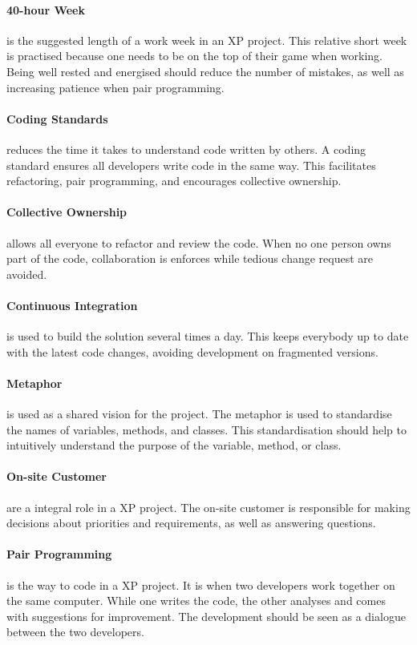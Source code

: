 \paragraph{40-hour Week} is the suggested length of a work week in an XP project.
This relative short week is practised because one needs to be on the top of their game when working.
Being well rested and energised should reduce the number of mistakes, as well as increasing patience when pair programming.

\paragraph{Coding Standards} reduces the time it takes to understand code written by others.
A coding standard ensures all developers write code in the same way.
This facilitates refactoring, pair programming, and encourages collective ownership.

\paragraph{Collective Ownership} allows all everyone to refactor and review the code.
When no one person owns part of the code, collaboration is enforces while tedious change request are avoided.

\paragraph{Continuous Integration} is used to build the solution several times a day.
This keeps everybody up to date with the latest code changes, avoiding development on fragmented versions.

\paragraph{Metaphor} is used as a shared vision for the project.
The metaphor is used to standardise the names of variables, methods, and classes. 
This standardisation should help to intuitively understand the purpose of the variable, method, or class.

\paragraph{On-site Customer} are a integral role in a XP project.
The on-site customer is responsible for making decisions about priorities and requirements, as well as answering questions.

\paragraph{Pair Programming} is the way to code in a XP project.
It is when two developers work together on the same computer.
While one writes the code, the other analyses and comes with suggestions for improvement.
The development should be seen as a dialogue between the two developers.

